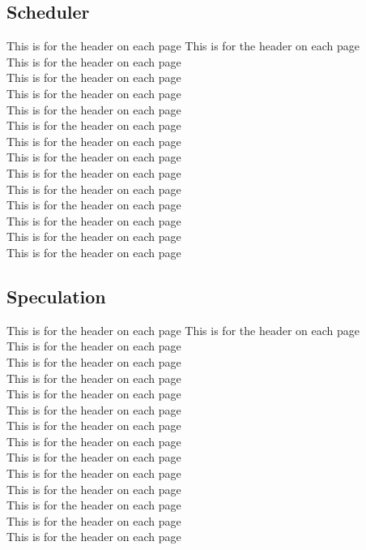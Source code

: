 \subsection{Scheduler }
This is for the header on each page
This is for the header on each page\\
This is for the header on each page\\
This is for the header on each page\\
This is for the header on each page\\
This is for the header on each page\\
This is for the header on each page\\
This is for the header on each page\\
This is for the header on each page\\
This is for the header on each page\\
This is for the header on each page\\
This is for the header on each page\\
This is for the header on each page\\
This is for the header on each page\\
This is for the header on each page
\subsection{Speculation}
This is for the header on each page
This is for the header on each page\\
This is for the header on each page\\
This is for the header on each page\\
This is for the header on each page\\
This is for the header on each page\\
This is for the header on each page\\
This is for the header on each page\\
This is for the header on each page\\
This is for the header on each page\\
This is for the header on each page\\
This is for the header on each page\\
This is for the header on each page\\
This is for the header on each page\\
This is for the header on each page
